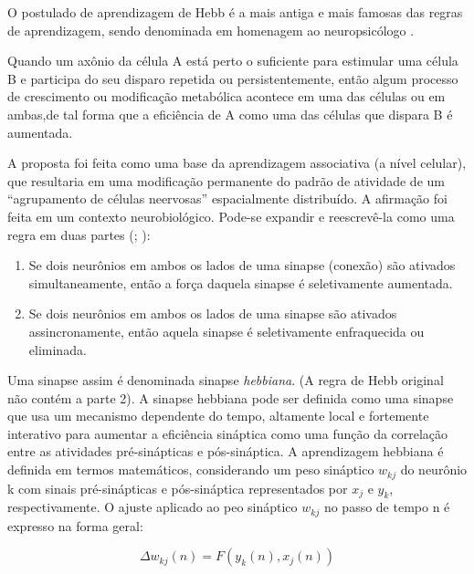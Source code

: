 O postulado de aprendizagem de Hebb é a mais antiga e mais famosas das regras de aprendizagem, sendo denominada em homenagem ao neuropsicólogo . 

    \begin{citacao}
        Quando um axônio da célula A está perto o suficiente para estimular uma célula B e participa do seu disparo repetida ou persistentemente, então algum processo de crescimento ou modificação metabólica acontece em uma das células ou em ambas,de tal forma que a eficiência de A como uma das células que dispara B é aumentada.
    \end{citacao}
    
    A proposta foi feita como uma base da aprendizagem associativa (a nível celular), que resultaria em uma modificação permanente do padrão de atividade de um ``agrupamento de células neervosas'' espacialmente distribuído. A afirmação foi feita em um contexto neurobiológico. Pode-se expandir e reescrevê-la como uma regra em duas partes (; ):
    \begin{enumerate}
        \item Se dois neurônios em ambos os lados de uma sinapse (conexão) são ativados simultaneamente, então a força daquela sinapse é seletivamente aumentada.
        \item Se dois neurônios em ambos os lados de uma sinapse são ativados assincronamente, então aquela sinapse é seletivamente enfraquecida ou eliminada.
    \end{enumerate}

Uma sinapse assim é denominada sinapse \textit{hebbiana}. (A regra de Hebb original não contém a parte 2). A sinapse hebbiana pode ser definida como uma sinapse que usa um mecanismo dependente do tempo, altamente local e fortemente interativo para aumentar a eficiência sináptica como uma função da correlação entre as atividades pré-sinápticas e pós-sináptica.
A aprendizagem hebbiana é definida em termos matemáticos, considerando um peso sináptico $w_{kj}$ do neurônio k com sinais pré-sinápticas e pós-sináptica representados por $x_{j}$ e $y_{k}$, respectivamente. O ajuste aplicado ao peo sináptico $w_{kj}$ no passo de tempo n é expresso na forma geral:

\begin{equation} \label{eq:hebb1}
    \Delta w_{kj}(n) = F(y_{k}(n), x_{j}(n))
\end{equation}

